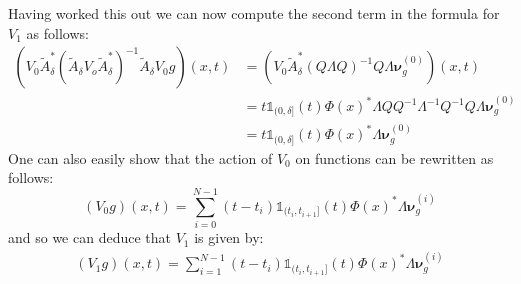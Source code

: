 \documentclass{article}
\theoremstyle{definition}
\theoremstyle{remark}
\theoremstyle{remark}
\begin{document}
\noindent Having worked this out we can now compute the second term in the formula for $V_{1}$ as follows:
\begin{align*}
    (V_{0}\tilde{A}_{\delta}^{*}(\tilde{A}_{\delta}V_{o}\tilde{A}_{\delta}^{*})^{-1}\tilde{A}_{\delta}V_{0}g)(x,t) &=
    (V_{0}\tilde{A}_{\delta}^{*}(Q\Lambda Q)^{-1}Q\Lambda\boldsymbol{\nu}_{g}^{(0)})(x,t) \\
    &=t\mathbb{1}_{(0,\delta]}(t)\Phi(x)^{*}\Lambda Q Q^{-1}\Lambda^{-1}Q^{-1}Q\Lambda\boldsymbol{\nu}_{g}^{(0)} \\
    &=t\mathbb{1}_{(0,\delta]}(t)\Phi(x)^{*}\Lambda\boldsymbol{\nu}_{g}^{(0)}
\end{align*}
One can also easily show that the action of $V_0$ on functions can be rewritten as follows:
\begin{equation}
    (V_{0}g)(x,t)=\sum_{i=0}^{N-1}(t-t_{i})\mathbb{1}_{(t_{i},t_{i+1}]}(t)\Phi(x)^{*}\Lambda\boldsymbol{\nu}_{g}^{(i)}
\end{equation}
and so we can deduce that $V_{1}$ is given by:
\begin{align*}
    (V_{1}g)(x,t) = \sum_{i=1}^{N-1}(t-t_{i})\mathbb{1}_{(t_{i},t_{i+1}]}(t)\Phi(x)^{*}\Lambda\boldsymbol{\nu}_{g}^{(i)}
\end{align*}
\end{document}
